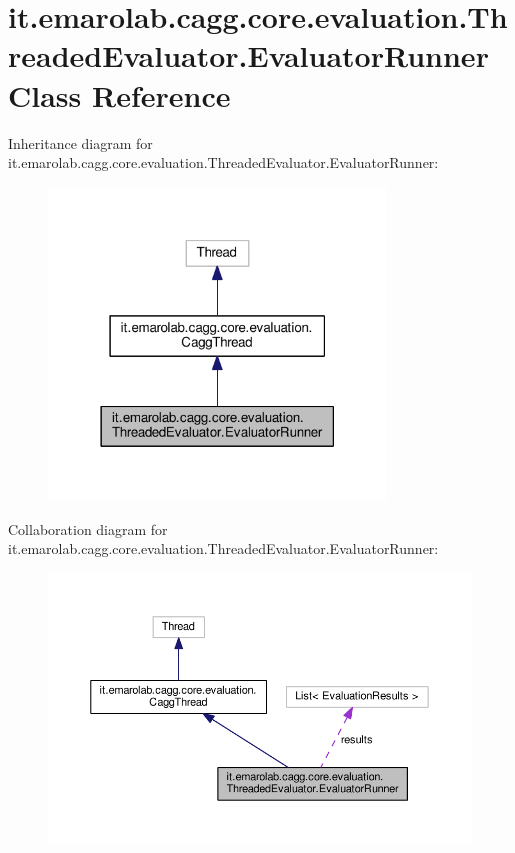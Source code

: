 \hypertarget{classit_1_1emarolab_1_1cagg_1_1core_1_1evaluation_1_1ThreadedEvaluator_1_1EvaluatorRunner}{\section{it.\-emarolab.\-cagg.\-core.\-evaluation.\-Threaded\-Evaluator.\-Evaluator\-Runner Class Reference}
\label{classit_1_1emarolab_1_1cagg_1_1core_1_1evaluation_1_1ThreadedEvaluator_1_1EvaluatorRunner}
}


Inheritance diagram for it.\-emarolab.\-cagg.\-core.\-evaluation.\-Threaded\-Evaluator.\-Evaluator\-Runner\-:\nopagebreak
\begin{figure}[H]
\begin{center}
\leavevmode
\includegraphics[width=254pt]{classit_1_1emarolab_1_1cagg_1_1core_1_1evaluation_1_1ThreadedEvaluator_1_1EvaluatorRunner__inherit__graph}
\end{center}
\end{figure}


Collaboration diagram for it.\-emarolab.\-cagg.\-core.\-evaluation.\-Threaded\-Evaluator.\-Evaluator\-Runner\-:\nopagebreak
\begin{figure}[H]
\begin{center}
\leavevmode
\includegraphics[width=350pt]{classit_1_1emarolab_1_1cagg_1_1core_1_1evaluation_1_1ThreadedEvaluator_1_1EvaluatorRunner__coll__graph}
\end{center}
\end{figure}
